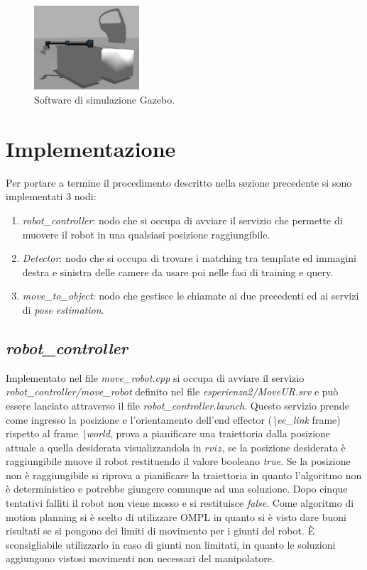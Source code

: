 \documentclass[english]{article}
\begin{document}
\begin{figure}[!h]
\centering
\includegraphics[width=0.35\textwidth]{gazebo}
\caption{Software di simulazione Gazebo.}
\label{fig:gazebo}
\end{figure}

\section{Implementazione}
Per portare a termine il procedimento descritto nella sezione precedente si sono implementati 3 nodi:
\begin{enumerate}
\item \textit{robot\_controller}: nodo che si occupa di avviare il servizio che permette di muovere il robot in una qualsiasi posizione raggiungibile.

\item \textit{Detector}: nodo che si occupa di trovare i matching tra template ed immagini destra e sinistra delle camere da usare poi nelle fasi di training e query.

\item \textit{move\_to\_object}: nodo che gestisce le chiamate ai due precedenti ed ai servizi di \textit{pose estimation}.
\end{enumerate}

\subsection{\textit{robot\_controller}}
Implementato nel file \textit{move\_robot.cpp} si occupa di avviare il servizio \textit{robot\_controller/move\_robot} definito nel file \textit{esperienza2/MoveUR.srv} e può essere lanciato attraverso il file \textit{robot\_controller.launch}. Questo servizio prende come ingresso la posizione e l'orientamento dell'end effector (\textit{\textbackslash ee\_link} frame) rispetto al frame \textit{\textbackslash world}, prova a pianificare una traiettoria dalla posizione attuale a quella desiderata  visualizzandola in $rviz$, se la posizione desiderata è raggiungibile muove il robot restituendo il valore booleano \textit{true}. Se la posizione non è raggiungibile si riprova a pianificare la traiettoria in quanto l'algoritmo non è deterministico e potrebbe giungere comunque ad una soluzione. Dopo cinque tentativi falliti il robot non viene mosso e si restituisce \textit{false}. Come algoritmo di motion planning si è scelto di utilizzare OMPL in quanto si è visto dare buoni risultati se si pongono dei limiti di movimento per i giunti del robot. È sconsigliabile utilizzarlo in caso di giunti non limitati, in quanto le soluzioni aggiungono vistosi movimenti non necessari del manipolatore.
\end{document}

